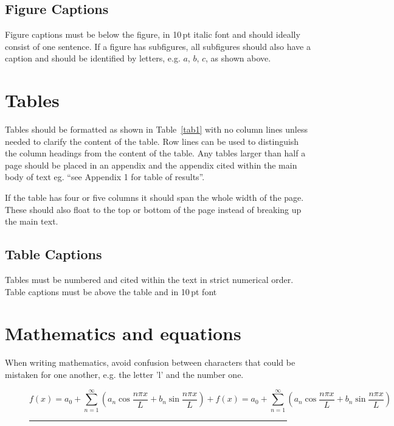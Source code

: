 \documentclass{cta-author}
\begin{document}
\subsection{Figure Captions}\label{subsec6.1}

Figure captions must be below the figure, in 10\,pt italic
font and should ideally consist of one sentence. If a
figure has subfigures, all subfigures should also have a
caption and should be identified by letters, e.g. $a$, $b$,
$c$, as shown above.

\section{Tables}\label{sec7}

Tables should be formatted as shown in Table~\ref{tab1}
with no column lines unless needed to clarify the content
of the table. Row lines can be used to distinguish the
column headings from the content of the table. Any tables
larger than half a page should be placed in an appendix and
the appendix cited within the main body of text eg. ``see
Appendix 1 for table of results''.

If the table has four or five columns it should span the
whole width of the page. These should also float to the top
or bottom of the page instead of breaking up the main text.

\subsection{Table Captions}\label{subsec7.1}

Tables must be numbered and cited within the text in strict
numerical order. Table captions must be above the table and
in 10\,pt font

\section{Mathematics and equations}\label{sec8}

When writing mathematics, avoid confusion between
characters that could be mistaken for one another, e.g. the
letter 'l' and the number one.

\setcounter{equation}{2}

\begin{figure}[!t]
\begin{equation}
f(x)  = a_0 + \sum_{n=1}^\infty
\left( {a_n \cos \frac{n\pi x}{L}+b_n \sin \frac{n\pi
x}{L}} \right)+f(x) =a_0 +\sum_{n=1}^\infty \left({a_n \cos \frac{n\pi x}{L}+b_n
\sin \frac{n\pi x}{L}} \right) \label{eq3}
\end{equation}
\noindent\rule{\textwidth}{.5pt}%
\end{figure}
\end{document}
